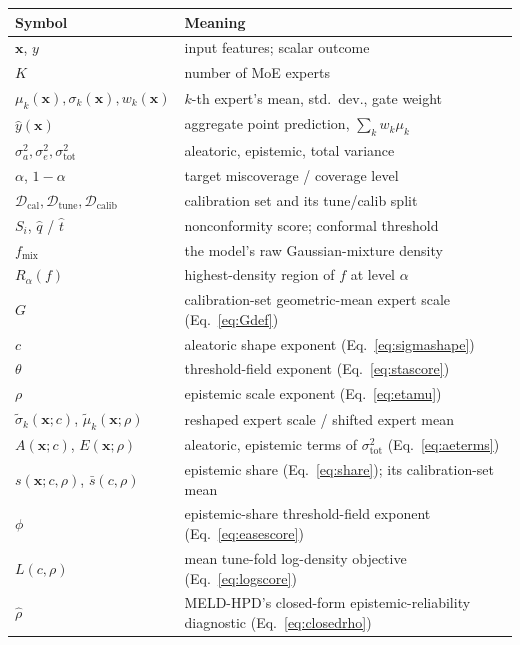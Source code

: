 \documentclass[11pt]{article}
\begin{document}
\begin{center}
\begin{tabular}{@{}ll@{}}
\toprule
Symbol & Meaning \\
\midrule
$\bm x$, $y$ & input features; scalar outcome \\
$K$ & number of MoE experts \\
$\mu_k(\bm x),\sigma_k(\bm x),w_k(\bm x)$ & $k$-th expert's mean, std.\ dev., gate weight \\
$\hat y(\bm x)$ & aggregate point prediction, $\sum_k w_k\mu_k$ \\
$\sigma_a^2,\sigma_e^2,\sigma_{\mathrm{tot}}^2$ & aleatoric, epistemic, total variance \\
$\alpha$, $1-\alpha$ & target miscoverage / coverage level \\
$\mathcal D_{\mathrm{cal}},\mathcal D_{\mathrm{tune}},\mathcal D_{\mathrm{calib}}$ & calibration
set and its tune/calib split \\
$S_i$, $\hat q$ / $\hat t$ & nonconformity score; conformal threshold \\
$f_{\mathrm{mix}}$ & the model's raw Gaussian-mixture density \\
$R_\alpha(f)$ & highest-density region of $f$ at level $\alpha$ \\
$G$ & calibration-set geometric-mean expert scale (Eq.~\ref{eq:Gdef}) \\
$c$ & aleatoric shape exponent (Eq.~\ref{eq:sigmashape}) \\
$\theta$ & threshold-field exponent (Eq.~\ref{eq:stascore}) \\
$\rho$ & epistemic scale exponent (Eq.~\ref{eq:etamu}) \\
$\tilde\sigma_k(\bm x;c)$, $\tilde\mu_k(\bm x;\rho)$ & reshaped expert scale / shifted expert mean \\
$A(\bm x;c)$, $E(\bm x;\rho)$ & aleatoric, epistemic terms of $\sigma_{\mathrm{tot}}^2$ (Eq.~\ref{eq:aeterms}) \\
$s(\bm x;c,\rho)$, $\bar s(c,\rho)$ & epistemic share (Eq.~\ref{eq:share}); its calibration-set mean \\
$\phi$ & epistemic-share threshold-field exponent (Eq.~\ref{eq:easescore}) \\
$L(c,\rho)$ & mean tune-fold log-density objective (Eq.~\ref{eq:logscore}) \\
$\hat\rho$ & MELD-HPD's closed-form epistemic-reliability diagnostic (Eq.~\ref{eq:closedrho}) \\
\bottomrule
\end{tabular}
\end{center}
\end{document}
